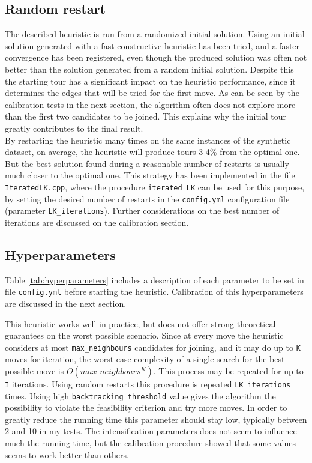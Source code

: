 \subsection{Random restart}
The described heuristic is run from a randomized initial solution. Using an initial solution generated with a fast constructive heuristic has been tried, and a faster convergence has been registered, even though the produced solution was often not better than the solution generated from a random initial solution.
Despite this the starting tour has a significant impact on the heuristic performance, since it determines the edges that will be tried for the first move. As can be seen by the calibration tests in the next section, the algorithm often does not explore more than the first two candidates to be joined. This explains why the initial tour greatly contributes to the final result.\\
By restarting the heuristic many times on the same instances of the synthetic dataset, on average, the heuristic will produce tours 3-4\% from the optimal one. But the best solution found during a reasonable number of restarts is usually much closer to the optimal one. This strategy has been implemented in the file \texttt{IteratedLK.cpp}, where the procedure \texttt{iterated\_LK} can be used for this purpose, by setting the desired number of restarts in the \texttt{config.yml} configuration file (parameter \texttt{LK\_iterations}). Further considerations on the best number of iterations are discussed on the calibration section.

\subsection{Hyperparameters}
Table \ref{tab:hyperparameters} includes a description of each parameter to be set in file \texttt{config.yml} before starting the heuristic. Calibration of this hyperparameters are discussed in the next section.


This heuristic works well in practice, but does not offer strong theoretical guarantees on the worst possible scenario. Since at every move the heuristic considers at most \texttt{max\_neighbours} candidates for joining, and it may do up to \texttt{K} moves for iteration, the worst case complexity of a single search for the best possible move is $O(max\_neighbours^K)$. This process may be repeated for up to \texttt{I} iterations. Using random restarts this procedure is repeated \texttt{LK\_iterations} times. Using high \texttt{backtracking\_threshold} value gives the algorithm the possibility to violate the feasibility criterion and try more moves. In order to greatly reduce the running time this parameter should stay low, typically between 2 and 10 in my tests.
The intensification parameters does not seem to influence much the running time, but the calibration procedure showed that some values seems to work better than others.

